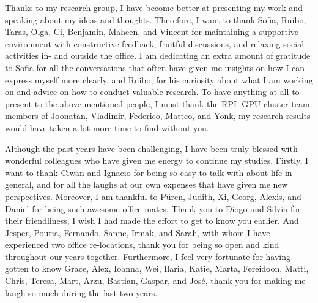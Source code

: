 \noindent 
Thanks to my research group, I have become better at presenting my work and speaking about my ideas and thoughts. Therefore, I want to thank 
Sofia, 
Ruibo, 
Taras, 
Olga, 
Ci, 
Benjamin, 
Maheen, 
and Vincent
for maintaining a supportive environment with constructive feedback, fruitful discussions, and relaxing social activities in- and outside the office. 
I am dedicating an extra amount of gratitude to Sofia for all the conversations that often have given me insights on how I can express myself more clearly, and Ruibo, for his curiosity about what I am working on and advice on how to conduct valuable research. 
To have anything at all to present to the above-mentioned people, I must thank the RPL GPU cluster team members of Joonatan, Vladimir, Federico, Matteo, and Yonk, my research results would have taken a lot more time to find without you. 
\newline 



\noindent 
Although the past years have been challenging, I have been truly blessed with wonderful colleagues who have given me energy to continue my studies.  
Firstly, I want to thank Ciwan and Ignacio for being so easy to talk with about life in general, and for all the laughs at our own expenses that have given me new perspectives. 
Moreover, I am thankful to 
P\"{u}ren, 
Judith, 
Xi, 
Georg, 
Alexis, 
and Daniel for being such awesome office-mates. 
Thank you to Diogo and Silvia for their friendliness, I wish I had made the effort to get to know you earlier. 
And  
Jesper, 
Pouria, 
Fernando,
Sanne, 
Irmak,
and Sarah, with whom I have experienced two office re-locations, thank you for being so open and kind throughout our years together. 
Furthermore, I feel very fortunate for having gotten to know
Grace, 
Alex, 
Ioanna,
Wei,
Ilaria, 
Katie,
Marta, 
Fereidoon,
Matti, 
Chris, 
Teresa, 
Mart,
Arzu, 
Bastian, 
Gaspar, 
and José,
thank you for making me laugh so much during the last two years. 
\newline 


